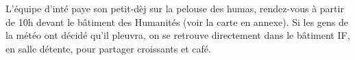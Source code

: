 L'équipe d'inté paye son petit-dèj sur la pelouse des humas, rendez-vous à
partir de 10h devant le bâtiment des Humanités (voir la carte en annexe). Si les
gens de la météo ont décidé qu'il pleuvra, on se retrouve directement dans le
bâtiment IF, en salle détente, pour partager croissants et café.
